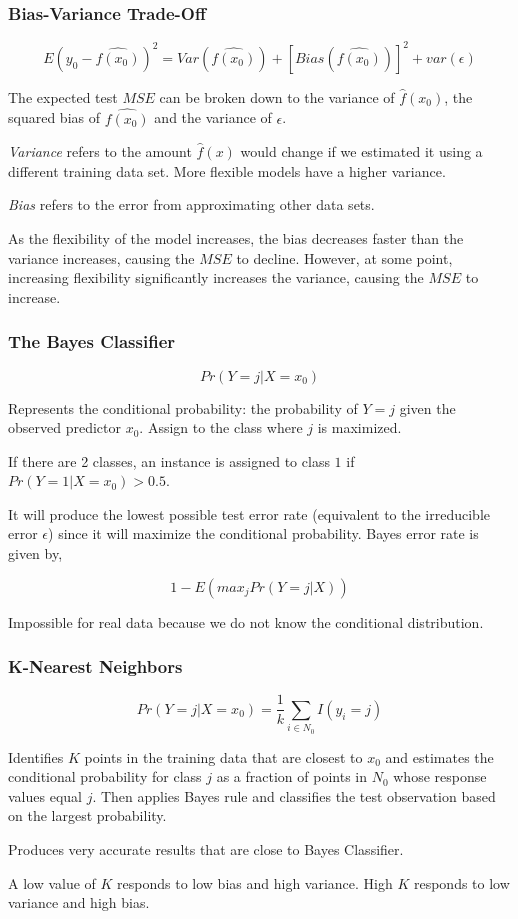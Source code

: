 \documentclass[
]{article}
\begin{document}
\hypertarget{header-n36}{%
\subsubsection{Bias-Variance Trade-Off}\label{header-n36}}

\[E(y_0-\hat{f(x_0)})^2 = Var(\hat{f(x_0)}) + [Bias(\hat{f(x_0)})]^2 + var(\epsilon)\]

The expected test \(MSE\) can be broken down to the variance of
\(\hat{f}(x_0)\), the squared bias of \(\hat{f(x_0)}\) and the variance
of \(\epsilon\).

\emph{Variance} refers to the amount \(\hat{f}(x)\) would change if we
estimated it using a different training data set. More flexible models
have a higher variance.

\emph{Bias} refers to the error from approximating other data sets.

As the flexibility of the model increases, the bias decreases faster
than the variance increases, causing the \(MSE\) to decline. However, at
some point, increasing flexibility significantly increases the variance,
causing the \(MSE\) to increase.

\hypertarget{header-n42}{%
\subsubsection{The Bayes Classifier}\label{header-n42}}

\[Pr(Y=j|X=x_0)\]

Represents the conditional probability: the probability of \(Y = j\)
given the observed predictor \(x_0\). Assign to the class where \(j\) is
maximized.

If there are 2 classes, an instance is assigned to class \(1\) if
\(Pr(Y=1|X=x_0) > 0.5\).

It will produce the lowest possible test error rate (equivalent to the
irreducible error \(\epsilon\)) since it will maximize the conditional
probability. Bayes error rate is given by,

\[1 - E(max_jPr(Y=j|X))\]

Impossible for real data because we do not know the conditional
distribution.

\hypertarget{header-n49}{%
\subsubsection{K-Nearest Neighbors}\label{header-n49}}

\[Pr(Y=j|X=x_0) = \frac{1}{k}\sum_{i\in N_0}I(y_i=j)\]

Identifies \(K\) points in the training data that are closest to \(x_0\)
and estimates the conditional probability for class \(j\) as a fraction
of points in \(N_0\) whose response values equal \(j\). Then applies
Bayes rule and classifies the test observation based on the largest
probability.

Produces very accurate results that are close to Bayes Classifier.

A low value of \(K\) responds to low bias and high variance. High \(K\)
responds to low variance and high bias.
\end{document}
